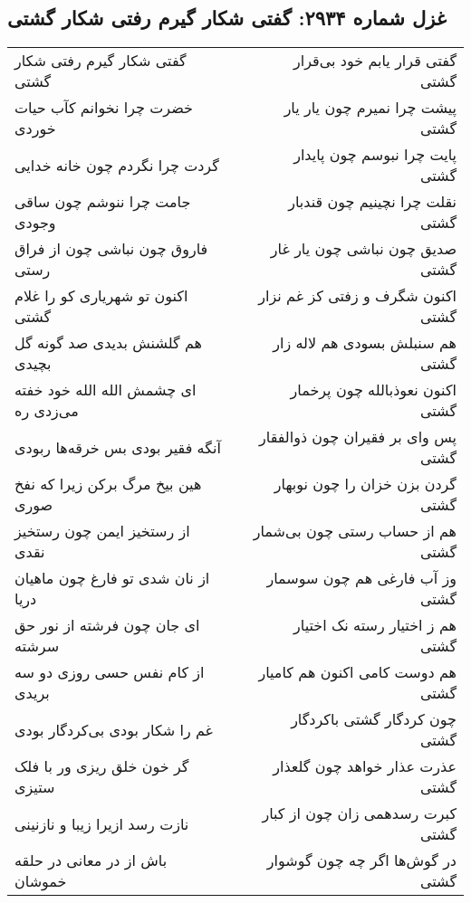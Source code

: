 \begin{center}
\section*{غزل شماره ۲۹۳۴: گفتی شکار گیرم رفتی شکار گشتی}
\label{sec:2934}
\begin{longtable}{l p{0.5cm} r}
گفتی شکار گیرم رفتی شکار گشتی
&&
گفتی قرار یابم خود بی‌قرار گشتی
\\
خضرت چرا نخوانم کآب حیات خوردی
&&
پیشت چرا نمیرم چون یار یار گشتی
\\
گردت چرا نگردم چون خانه خدایی
&&
پایت چرا نبوسم چون پایدار گشتی
\\
جامت چرا ننوشم چون ساقی وجودی
&&
نقلت چرا نچینیم چون قندبار گشتی
\\
فاروق چون نباشی چون از فراق رستی
&&
صدیق چون نباشی چون یار غار گشتی
\\
اکنون تو شهریاری کو را غلام گشتی
&&
اکنون شگرف و زفتی کز غم نزار گشتی
\\
هم گلشنش بدیدی صد گونه گل بچیدی
&&
هم سنبلش بسودی هم لاله زار گشتی
\\
ای چشمش الله الله خود خفته می‌زدی ره
&&
اکنون نعوذبالله چون پرخمار گشتی
\\
آنگه فقیر بودی بس خرقه‌ها ربودی
&&
پس وای بر فقیران چون ذوالفقار گشتی
\\
هین بیخ مرگ برکن زیرا که نفخ صوری
&&
گردن بزن خزان را چون نوبهار گشتی
\\
از رستخیز ایمن چون رستخیز نقدی
&&
هم از حساب رستی چون بی‌شمار گشتی
\\
از نان شدی تو فارغ چون ماهیان دریا
&&
وز آب فارغی هم چون سوسمار گشتی
\\
ای جان چون فرشته از نور حق سرشته
&&
هم ز اختیار رسته نک اختیار گشتی
\\
از کام نفس حسی روزی دو سه بریدی
&&
هم دوست کامی اکنون هم کامیار گشتی
\\
غم را شکار بودی بی‌کردگار بودی
&&
چون کردگار گشتی باکردگار گشتی
\\
گر خون خلق ریزی ور با فلک ستیزی
&&
عذرت عذار خواهد چون گلعذار گشتی
\\
نازت رسد ازیرا زیبا و نازنینی
&&
کبرت رسدهمی زان چون از کبار گشتی
\\
باش از در معانی در حلقه خموشان
&&
در گوش‌ها اگر چه چون گوشوار گشتی
\\
\end{longtable}
\end{center}
